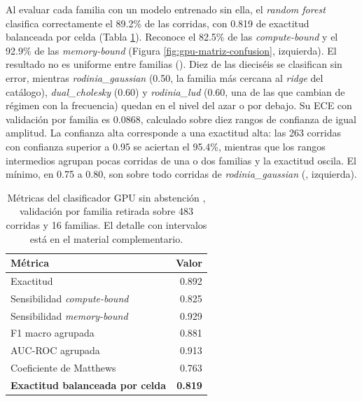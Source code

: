 Al evaluar cada familia con un modelo entrenado sin ella, el \textit{random forest} clasifica correctamente el 89.2\% de las corridas, con 0.819 de exactitud balanceada por celda (Tabla \ref{tab:gpu-metricas-valores}). Reconoce el 82.5\% de las \textit{compute-bound} y el 92.9\% de las \textit{memory-bound} (Figura \ref{fig:gpu-matriz-confusion}, izquierda). El resultado no es uniforme entre familias (). Diez de las dieciséis se clasifican sin error, mientras \textit{rodinia\_gaussian} (0.50, la familia más cercana al \textit{ridge} del catálogo), \textit{dual\_cholesky} (0.60) y \textit{rodinia\_lud} (0.60, una de las que cambian de régimen con la frecuencia) quedan en el nivel del azar o por debajo.
Su ECE con validación por familia es 0.0868, calculado sobre diez rangos de confianza de igual amplitud. La confianza alta corresponde a una exactitud alta: las 263 corridas con confianza superior a 0.95 se aciertan el 95.4\%, mientras que los rangos intermedios agrupan pocas corridas de una o dos familias y la exactitud oscila. El mínimo, en 0.75 a 0.80, son sobre todo corridas de \textit{rodinia\_gaussian} (, izquierda).

\begin{table}[h!]
\centering
\caption[Métricas del clasificador GPU]{Métricas del clasificador GPU sin abstención \cite{SokolovaLapalme2009,ChiccoJurman2020}, validación por familia retirada sobre 483 corridas y 16 familias. El detalle con intervalos está en el material complementario.}
\label{tab:gpu-metricas-valores}
\small
\begin{tabular}{@{}lr@{}}
\toprule
\textbf{Métrica} & \textbf{Valor} \\
\midrule
Exactitud & 0.892 \\
Sensibilidad \textit{compute-bound} & 0.825 \\
Sensibilidad \textit{memory-bound} & 0.929 \\
F1 macro agrupada & 0.881 \\
AUC-ROC agrupada & 0.913 \\
Coeficiente de Matthews & 0.763 \\
\textbf{Exactitud balanceada por celda} & \textbf{0.819} \\
\bottomrule
\end{tabular}
\end{table}

